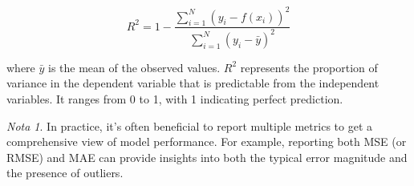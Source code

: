 \documentclass[11pt,a4paper]{article}
\theoremstyle{definition}
\theoremstyle{plain}
\theoremstyle{remark}
\newtheorem*{remark}{Nota}
\begin{document}
\begin{equation}
R^2 = 1 - \frac{\sum_{i=1}^{N} (y_i - f(x_i))^2}{\sum_{i=1}^{N} (y_i - \bar{y})^2}
\end{equation}

where $\bar{y}$ is the mean of the observed values. $R^2$ represents the proportion of variance in the dependent variable that is predictable from the independent variables. It ranges from 0 to 1, with 1 indicating perfect prediction.

\begin{remark}
In practice, it's often beneficial to report multiple metrics to get a comprehensive view of model performance. For example, reporting both MSE (or RMSE) and MAE can provide insights into both the typical error magnitude and the presence of outliers.
\end{remark}
\end{document}
